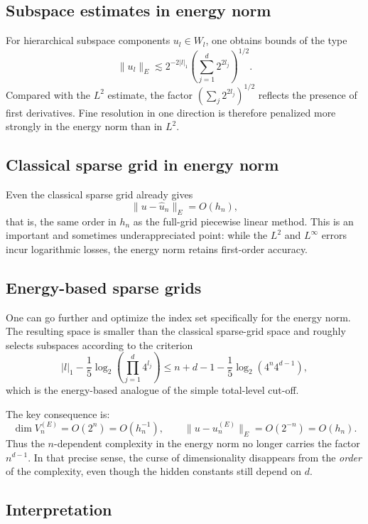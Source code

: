 \documentclass[11pt,a4paper]{report}
\begin{document}
\subsection{Subspace estimates in energy norm}

For hierarchical subspace components $u_l\in W_l$, one obtains bounds of the type
$$
\|u_l\|_E
\lesssim
2^{-2|l|_1}
\left(
\sum_{j=1}^d 2^{2l_j}
\right)^{1/2}.
$$
Compared with the $L^2$ estimate, the factor $\left(\sum_j 2^{2l_j}\right)^{1/2}$ reflects the presence of first derivatives. Fine resolution in one direction is therefore penalized more strongly in the energy norm than in $L^2$.

\subsection{Classical sparse grid in energy norm}

Even the classical sparse grid already gives
$$
\|u-\widehat u_n\|_E = O(h_n),
$$
that is, the same order in $h_n$ as the full-grid piecewise linear method. This is an important and sometimes underappreciated point: while the $L^2$ and $L^\infty$ errors incur logarithmic losses, the energy norm retains first-order accuracy.

\subsection{Energy-based sparse grids}

One can go further and optimize the index set specifically for the energy norm. The resulting space is smaller than the classical sparse-grid space and roughly selects subspaces according to the criterion
$$
|l|_1 - \frac{1}{5}\log_2\!\left(\prod_{j=1}^d 4^{l_j}\right)
\le n+d-1 - \frac{1}{5}\log_2(4^n 4^{d-1}),
$$
which is the energy-based analogue of the simple total-level cut-off.

The key consequence is:
$$
\dim V_n^{(E)} = O(2^n)=O(h_n^{-1}),
\qquad
\|u-u_n^{(E)}\|_E = O(2^{-n})=O(h_n).
$$
Thus the $n$-dependent complexity in the energy norm no longer carries the factor $n^{d-1}$. In that precise sense, the curse of dimensionality disappears from the \emph{order} of the complexity, even though the hidden constants still depend on $d$.

\subsection{Interpretation}
\end{document}

